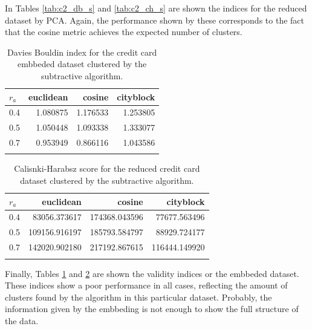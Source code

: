 \documentclass[conference]{IEEEtran}
\begin{document}
    In Tables \ref{tab:c2_db_s} and \ref{tab:c2_ch_s} are shown the indices for the reduced dataset by PCA. Again, the performance shown by these corresponds to the fact that the cosine metric achieves the expected number of clusters.
    
    \begin{table}[ht!]
        \centering
        \begin{tabular}{lrrr}
        \toprule
        $r_a$ &  euclidean &    cosine &  cityblock \\
        \midrule
        0.4 &   1.080875 &  1.176533 &   1.253805 \\
        0.5 &   1.050448 &  1.093338 &   1.333077 \\
        0.7 &   0.953949 &  0.866116 &   1.043586 \\
        \bottomrule \\
        \end{tabular}
        \caption{Davies Bouldin index for the credit card embbeded dataset clustered by the subtractive algorithm.}
        \label{tab:ce_db_s}
    \end{table}
    
    \begin{table}[ht!]
        \centering
        \begin{tabular}{lrrr}
        \toprule
        $r_a$ &      euclidean &         cosine &      cityblock \\
        \midrule
        0.4 &   83056.373617 &  174368.043596 &   77677.563496 \\
        0.5 &  109156.916197 &  185793.584797 &   88929.724177 \\
        0.7 &  142020.902180 &  217192.867615 &  116444.149920 \\
        \bottomrule \\
        \end{tabular}
        \caption{Calisnki-Harabsz score for the reduced credit card dataset clustered by the subtractive algorithm.}
        \label{tab:ce_ch_s}
    \end{table}
    
    Finally, Tables \ref{tab:ce_db_s} and \ref{tab:ce_ch_s} are shown the validity indices or the embbeded dataset. These indices show a poor performance in all cases, reflecting the amount of clusters found by the algorithm in this particular dataset. Probably, the information given by the embbeding is not enough to show the full structure of the data.
    
\end{document}
